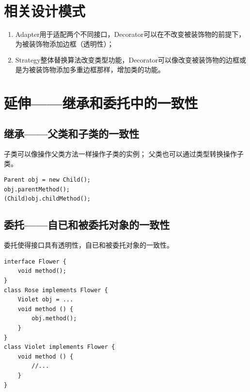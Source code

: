 \section{相关设计模式}
\begin{enumerate}
	\item Adapter用于适配两个不同接口，Decorator可以在不改变被装饰物的前提下，为被装饰物添加边框（透明性）；
	\item Strategy整体替换算法改变类型功能，Decorator可以像改变被装饰物的边框或是为被装饰物添加多重边框那样，增加类的功能。
\end{enumerate}
\section{延伸——继承和委托中的一致性}
\subsection{继承——父类和子类的一致性}
子类可以像操作父类方法一样操作子类的实例；
父类也可以通过类型转换操作子类。
\begin{lstlisting}
Parent obj = new Child();
obj.parentMethod();
(Child)obj.childMethod();
\end{lstlisting}
\subsection{委托——自已和被委托对象的一致性}
委托使得接口具有透明性，自已和被委托对象的一致性。
\begin{lstlisting}
interface Flower {
	void method();
}
class Rose implements Flower {
	Violet obj = ...
	void method () {
		obj.method();
	}
}
class Violet implements Flower {
	void method () {
		//...
	}
}
\end{lstlisting}